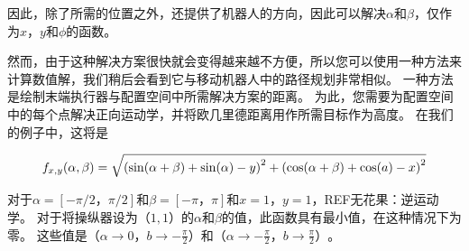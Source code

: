 
因此，除了所需的位置之外，还提供了机器人的方向，因此可以解决$ \alpha $和$ \beta $，仅作为$ x $，$ y $和$ \phi $的函数。

然而，由于这种解决方案很快就会变得越来越不方便，所以您可以使用一种方法来计算数值解，我们稍后会看到它与移动机器人中的路径规划非常相似。 一种方法是绘制末端执行器与配置空间中所需解决方案的距离。 为此，您需要为配置空间中的每个点解决正向运动学，并将欧几里德距离用作所需目标作为高度。 在我们的例子中，这将是

\begin{equation}
\small
f_{x,y}(\alpha,\beta)=\sqrt{\left(\sin(\alpha + \beta) + \sin(\alpha) - y\right)^2 + \left(\cos(\alpha+\beta)+\cos(a) - x\right)^2}
\end{equation}


对于$ \alpha = [ - \pi / 2，\pi / 2] $和$ \beta = [ - \pi，\pi] $和$ x = 1 $，$ y = 1 $，REF{无花果：逆运动学}。 对于将操纵器设为$（1,1）$的$ \alpha $和$ \beta $的值，此函数具有最小值，在这种情况下为零。 这些值是$（\alpha \rightarrow 0，b \rightarrow - \frac {\pi} {2}）$和$（\alpha \rightarrow - \frac {\pi} {2}，b \rightarrow \frac {\pi} {2}）$。

